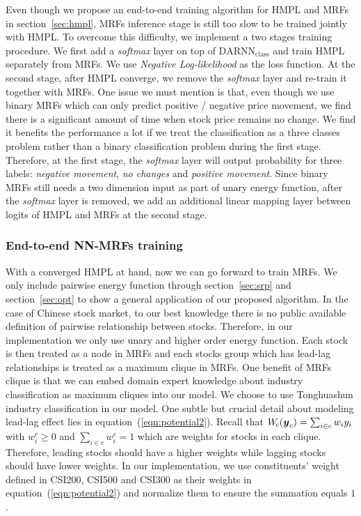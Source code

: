 \documentclass[sigconf, anonymous, review]{acmart}
\renewcommand{\cite}{\citep}
\begin{document}
Even though we propose an end-to-end training algorithm for HMPL
and MRFs in section~\ref{sec:hmpl}, MRFs inference stage is still
too slow to be trained jointly with HMPL. To overcome this
difficulty, we implement a two stages training procedure. We
first add a \emph{softmax} layer on top of
$\text{DARNN}_{\text{class}}$ and train HMPL separately from
MRFs. We use \emph{Negative Log-likelihood} as the loss function.
At the second stage, after HMPL converge, we remove the
\emph{softmax} layer and re-train it together with MRFs. One
issue we must mention is that, even though we use binary MRFs
which can only predict positive / negative price movement, we
find there is a significant amount of time when stock price
remains no change. We find it benefits the performance a lot if
we treat the classification as a three classes problem rather
than a binary classification problem during the first stage.
Therefore, at the first stage, the \emph{softmax} layer will
output probability for three labels: \emph{negative movement},
\emph{no changes} and \emph{positive movement}. Since binary MRFs
still needs a two dimension input as part of unary energy
function, after the \emph{softmax} layer is removed, we add an
additional linear mapping layer between logits of HMPL and MRFs
at the second stage.

\subsubsection{End-to-end NN-MRFs training}
\label{sec:mrf_train}

With a converged HMPL at hand, now we can go forward to train
MRFs. We only include pairwise energy function through
section~\ref{sec:srp} and section~\ref{sec:opt} to show a general
application of our proposed algorithm. In the case of Chinese
stock market, to our best knowledge there is no public available
definition of pairwise relationship between stocks. Therefore, in
our implementation we only use unary and higher order energy
function. Each stock is then treated as a node in MRFs and each
stocks group which has lead-lag relationships is treated as a
maximum clique in MRFs. One benefit of MRFs clique is that we can
embed domain expert knowledge about industry classification as
maximum cliques into our model. We choose to use Tonghuashun
industry classification \cite{ths} in our model. One subtle but
crucial detail about modeling lead-lag effect lies in
equation~(\ref{eqn:potential2}). Recall that $W_{\!c}({\boldsymbol{y}}_c) =
\sum_{i \in c} w_i y_i$ with $w^c_i \geq 0$ and $\sum_{i \in c}
w^c_i = 1$ which are weights for stocks in each clique.
Therefore, leading stocks should have a higher weights while
lagging stocks should have lower weights. In our implementation,
we use constituents' weight defined in CSI200, CSI500 and CSI300
as their weights in equation~(\ref{eqn:potential2}) and normalize
them to ensure the summation equals $1$.
\end{document}
